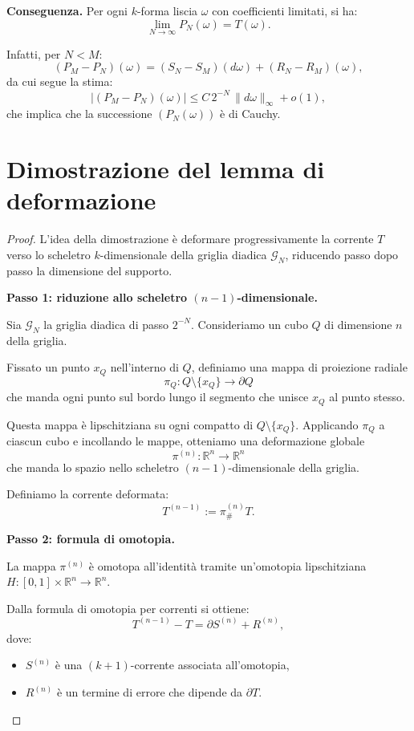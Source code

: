 \documentclass[a4paper,11pt]{article}
\theoremstyle{definition}
\begin{document}
\medskip

\noindent
\textbf{Conseguenza.}
Per ogni $k$-forma liscia $\omega$ con coefficienti limitati,
si ha:
\[
\lim_{N\to\infty} P_N(\omega) = T(\omega).
\]

Infatti, per $N < M$:
\[
(P_M - P_N)(\omega)
= (S_N - S_M)(d\omega) + (R_N - R_M)(\omega),
\]
da cui segue la stima:
\[
|(P_M - P_N)(\omega)|
\le C\,2^{-N}\,\|d\omega\|_\infty
+ o(1),
\]
che implica che la successione $(P_N(\omega))$ è di Cauchy.

\section{Dimostrazione del lemma di deformazione}

\begin{proof}
L'idea della dimostrazione è deformare progressivamente la corrente $T$
verso lo scheletro $k$-dimensionale della griglia diadica $\mathcal{G}_N$,
riducendo passo dopo passo la dimensione del supporto.

\medskip

\noindent
\textbf{Passo 1: riduzione allo scheletro $(n-1)$-dimensionale.}

Sia $\mathcal{G}_N$ la griglia diadica di passo $2^{-N}$.
Consideriamo un cubo $Q$ di dimensione $n$ della griglia.

Fissato un punto $x_Q$ nell'interno di $Q$, definiamo una mappa di proiezione radiale
\[
\pi_Q : Q \setminus \{x_Q\} \to \partial Q
\]
che manda ogni punto sul bordo lungo il segmento che unisce $x_Q$ al punto stesso.

Questa mappa è lipschitziana su ogni compatto di $Q \setminus \{x_Q\}$.
Applicando $\pi_Q$ a ciascun cubo e incollando le mappe,
otteniamo una deformazione globale
\[
\pi^{(n)} : \mathbb{R}^n \to \mathbb{R}^n
\]
che manda lo spazio nello scheletro $(n-1)$-dimensionale della griglia.

Definiamo la corrente deformata:
\[
T^{(n-1)} := \pi^{(n)}_{\#} T.
\]

\medskip

\noindent
\textbf{Passo 2: formula di omotopia.}

La mappa $\pi^{(n)}$ è omotopa all'identità tramite un'omotopia lipschitziana
$H : [0,1]\times \mathbb{R}^n \to \mathbb{R}^n$.

Dalla formula di omotopia per correnti si ottiene:
\[
T^{(n-1)} - T = \partial S^{(n)} + R^{(n)},
\]
dove:
\begin{itemize}
\item $S^{(n)}$ è una $(k+1)$-corrente associata all'omotopia,
\item $R^{(n)}$ è un termine di errore che dipende da $\partial T$.
\end{itemize}


\end{proof}
\end{document}

